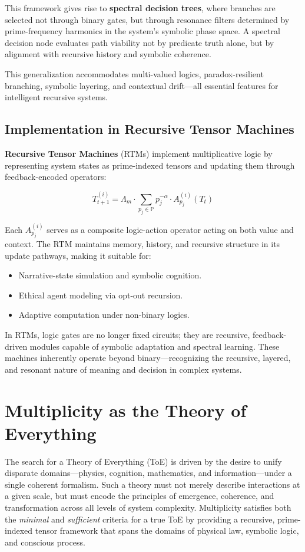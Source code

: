 \documentclass{article}
\theoremstyle{plain}
\begin{document}
This framework gives rise to \textbf{spectral decision trees}, where branches are selected not through binary gates, but through resonance filters determined by prime-frequency harmonics in the system's symbolic phase space. A spectral decision node evaluates path viability not by predicate truth alone, but by alignment with recursive history and symbolic coherence.

This generalization accommodates multi-valued logics, paradox-resilient branching, symbolic layering, and contextual drift—all essential features for intelligent recursive systems.

\subsection{Implementation in Recursive Tensor Machines}

\textbf{Recursive Tensor Machines} (RTMs) implement multiplicative logic by representing system states as prime-indexed tensors and updating them through feedback-encoded operators:

\[
T_{t+1}^{(i)} = \Lambda_m \cdot \sum_{p_j \in \mathbb{P}} p_j^{-\alpha} \cdot A_{p_j}^{(i)}(T_t)
\]

Each \( A_{p_j}^{(i)} \) serves as a composite logic-action operator acting on both value and context. The RTM maintains memory, history, and recursive structure in its update pathways, making it suitable for:
\begin{itemize}
    \item Narrative-state simulation and symbolic cognition.
    \item Ethical agent modeling via opt-out recursion.
    \item Adaptive computation under non-binary logics.
\end{itemize}

In RTMs, logic gates are no longer fixed circuits; they are recursive, feedback-driven modules capable of symbolic adaptation and spectral learning. These machines inherently operate beyond binary—recognizing the recursive, layered, and resonant nature of meaning and decision in complex systems.

\section{Multiplicity as the Theory of Everything}

The search for a Theory of Everything (ToE) is driven by the desire to unify disparate domains—physics, cognition, mathematics, and information—under a single coherent formalism. Such a theory must not merely describe interactions at a given scale, but must encode the principles of emergence, coherence, and transformation across all levels of system complexity. Multiplicity satisfies both the \textit{minimal} and \textit{sufficient} criteria for a true ToE by providing a recursive, prime-indexed tensor framework that spans the domains of physical law, symbolic logic, and conscious process.
\end{document}
